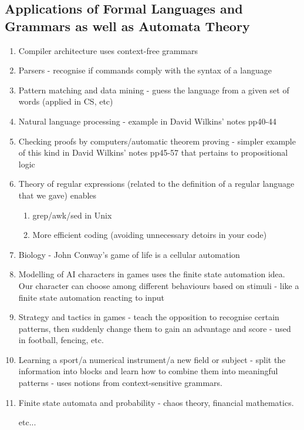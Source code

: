 \documentclass[10pt]{article}
\begin{document}
	\subsection{Applications of Formal Languages and Grammars as well as Automata Theory}
	\begin{enumerate}
		\item Compiler architecture uses context-free grammars
		\item Parsers - recognise if commands comply with the syntax of a language
		\item Pattern matching and data mining - guess the language from a given set of words (applied in CS, etc)
		\item Natural language processing - example in David Wilkins' notes pp40-44
		\item Checking proofs by computers/automatic theorem proving - simpler example of this kind in David Wilkins' notes pp45-57 that pertains to propositional logic
		\item Theory of regular expressions (related to the definition of a regular language that we gave) enables
		\begin{enumerate}
			\item grep/awk/sed in Unix
			\item More efficient coding (avoiding unnecessary detoirs in your code)
		\end{enumerate}
		\item Biology - John Conway's game of life is a cellular automation
		\item Modelling of AI characters in games uses the finite state automation idea. Our character can choose among different behaviours based on stimuli - like a finite state automation reacting to input
		\item Strategy and tactics in games - teach the opposition to recognise certain patterns, then suddenly change them to gain an advantage and score - used in football, fencing, etc.
		\item Learning a sport/a numerical instrument/a new field or subject - split the information into blocks and learn how to combine them into meaningful patterns - uses notions from context-sensitive grammars.
		\item Finite state automata and probability - chaos theory, financial mathematics.
		\item[etc...]
	\end{enumerate}
	
\end{document}
